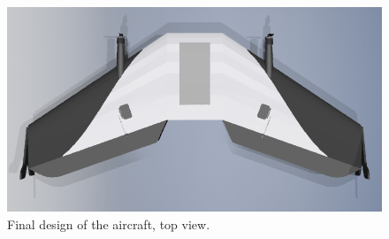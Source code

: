 \begin{figure}
\centering
  \includegraphics[width=\linewidth]{figs/finalrendertop.png}
  \caption{Final design of the aircraft, top view.}
  \label{fig:finalrendertop}
\end{figure}


